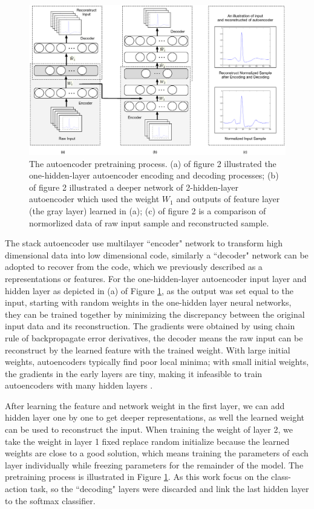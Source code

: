 \documentclass[journal]{IEEEtran}
\begin{document}
\begin{figure}[]
\centering
\includegraphics[width=6.5 in]{Figure2}
\caption{The autoencoder pretraining process. (a) of figure 2 illustrated the one-hidden-layer autoencoder encoding and decoding processes; (b) of figure 2 illustrated a deeper network of 2-hidden-layer autoencoder which used the weight $W_1$ and outputs of feature layer (the gray layer) learned in (a); (c) of figure 2 is a comparison of normorlized data of raw input sample and reconstructed sample.}
\label{figure2}
\end{figure}

The stack autoencoder use multilayer ``encoder" network to transform high dimensional data into low dimensional code, similarly a ``decoder" network can be adopted to recover from the code, which we previously described as a representations or features. For the one-hidden-layer autoencoder input layer and hidden layer as depicted in (a) of Figure \ref{figure2}, as the output was set equal to the input, starting with random weights in the one-hidden layer neural networks, they can be trained together by minimizing the discrepancy between the original input data and its reconstruction. The gradients were obtained by using chain rule of backpropagate error derivatives, the decoder means the raw input can be reconstruct by the learned feature with the trained weight.
With large initial weights, autoencoders typically find poor local minima; with small initial weights, the gradients in the early layers are tiny, making it infeasible to train autoencoders with many hidden layers \cite{hinton}. 

After learning the feature and network weight in the first layer, we can add hidden layer one by one to get deeper representations, as well the learned weight can be used to reconstruct the input. When training the weight of layer 2, we take the weight in layer 1 fixed replace random initialize because the learned weights are close to a good solution, which means training the parameters of each layer individually while freezing parameters for the remainder of the model. The pretraining process is illustrated in Figure \ref{figure2}. As this work focus on the class-action task, so the ``decoding" layers were discarded and link the last hidden layer to the softmax classifier. 
\end{document}
